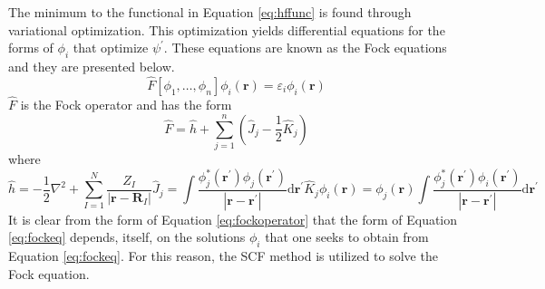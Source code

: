 \documentclass[final,3p,times,twocolumn]{elsarticle}
\begin{document}
The minimum to the functional in Equation \eqref{eq:hffunc} is found through variational optimization.\cite{fock} This optimization yields differential equations for the forms of $\phi_i$ that optimize $\psi^\prime$. These equations are known as the Fock equations and they are presented below. %
\begin{equation} \label{eq:fockeq}
\hat F[\phi_1, \ldots, \phi_n] \phi_i(\mathbf{r}) = \varepsilon_i \phi_i(\mathbf{r})
\end{equation}
$\hat F$ is the Fock operator and has the form
\begin{equation} \label{eq:fockoperator}
\hat F = \hat h  + \sum_{j=1}^n \left( \hat J_j - \frac{1}{2}\hat K_j \right)
\end{equation}
where
\begin{subequations}
\begin{equation} \label{eq:fockcore}
\hat h = -\frac{1}{2}\nabla^2 + \sum_{I = 1}^N \frac{Z_I}{|\mathbf{r} - \mathbf{R}_I|} 
\end{equation}
\begin{equation} \label{eq:fockcoloumb}
\hat J_j = \int \frac{\phi_j^*(\mathbf{r}^\prime)\phi_j(\mathbf{r}^\prime)}{|\mathbf{r}-\mathbf{r}^\prime|} \mathrm{d}\mathbf{r}^\prime
\end{equation}
\begin{equation} \label{eq:fockexchange}
\hat K_j \phi_i(\mathbf{r}) = \phi_j(\mathbf{r})\int \frac{\phi_j^*(\mathbf{r}^\prime)\phi_i(\mathbf{r}^\prime)}{|\mathbf{r}-\mathbf{r^\prime}|} \mathrm{d}\mathbf{r}^\prime
\end{equation}
\end{subequations}
It is clear from the form of Equation \eqref{eq:fockoperator} that the form of Equation \eqref{eq:fockeq} depends, itself, on the solutions $\phi_i$ that one seeks to obtain from Equation \eqref{eq:fockeq}. For this reason, the SCF method is utilized to solve the Fock equation.
\end{document}
